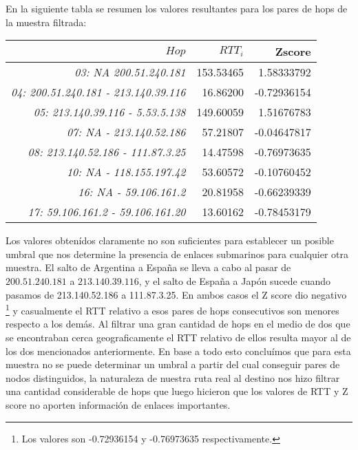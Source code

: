 En la siguiente tabla se resumen los valores resultantes para los pares de hops de la muestra filtrada: 

\begin{table}[h]
    \centering
    \begin{tabular}{r | r | r}
        $Hop$ &$RTT_i$  &Zscore\\
        \hline\hline
\textit{03: NA  200.51.240.181}& 153.53465& 1.58333792\\
\textit{04: 200.51.240.181 - 213.140.39.116}&  16.86200& -0.72936154\\
\textit{05: 213.140.39.116 - 5.53.5.138}& 149.60059&  1.51676783\\
\textit{07: NA - 213.140.52.186}& 57.21807& -0.04647817\\
\textit{08: 213.140.52.186 - 111.87.3.25}&  14.47598& -0.76973635\\
\textit{10: NA - 118.155.197.42}&  53.60572& -0.10760452\\
\textit{16: NA - 59.106.161.2}& 20.81958& -0.66239339\\
\textit{17: 59.106.161.2 - 59.106.161.20}&  13.60162& -0.78453179\\
        \hline\hline
    \end{tabular}
    \bigskip
    \label{tab:tokyo_table}
\end{table}

\par Los valores obten\'idos claramente no son suficientes para establecer un posible umbral que nos determine la presencia de enlaces submarinos para cualquier otra muestra. El salto de Argentina a Espa\~na se lleva a cabo al pasar de $200.51.240.181$ a $213.140.39.116$, y el salto de Espa\~na a Jap\'on sucede cuando pasamos de 213.140.52.186 a 111.87.3.25. En ambos casos el Z score dio negativo \footnote{Los valores son -0.72936154 y -0.76973635 respectivamente.} y casualmente el RTT relativo a esos pares de hops consecutivos son menores respecto a los dem\'as. Al filtrar una gran cantidad de hops en el medio de dos que se encontraban cerca geograficamente el RTT relativo de ellos resulta mayor al de los dos mencionados anteriormente. \newline
En base a todo esto conclu\'imos que para esta muestra no se puede determinar un umbral a partir del cual conseguir pares de nodos distinguidos, la naturaleza de nuestra ruta real al destino nos hizo filtrar una cantidad considerable de hops que luego hicieron que los valores de RTT y Z score no aporten informaci\'on de enlaces importantes. 

